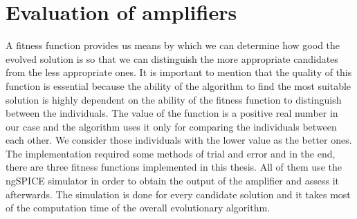 \chapter{Evaluation of amplifiers} \label{chromosomes-evaluation}
A fitness function provides us means by which we can determine how good the evolved solution is so that we can distinguish the more appropriate candidates from the less appropriate ones. It is important to mention that the quality of this function is essential because the ability of the algorithm to find the most suitable solution is highly dependent on the ability of the fitness function to distinguish between the individuals. The value of the function is a positive real number in our case and the algorithm uses it only for comparing the individuals between each other. We consider those individuals with the lower value as the better ones.\\
The implementation required some methods of trial and error and in the end, there are three fitness functions implemented in this thesis. All of them use the ngSPICE simulator in order to obtain the output of the amplifier and assess it afterwards. The simulation is done for every candidate solution and it takes most of the computation time of the overall evolutionary algorithm.

